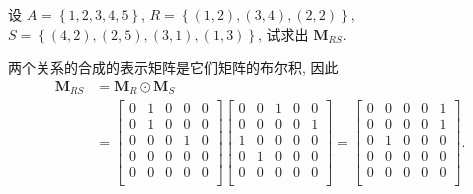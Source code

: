 \documentclass[10pt,UTF8]{book} %
\begin{document}
\begin{exercise}
    设 $A = \left\{1,2,3,4,5\right\}$,
    $R = \left\{ (1,2), (3,4), (2,2) \right\}$,
    $S = \left\{ (4,2), (2,5), (3,1), (1,3) \right\}$,
    试求出 $\boldsymbol{M}_{RS}$.
    \begin{sol}
        两个关系的合成的表示矩阵是它们矩阵的布尔积,
        因此 
        \[ \begin{aligned}
            \boldsymbol{M}_{RS} &= \boldsymbol{M}_{R} \odot
            \boldsymbol{M}_{S} \\
            &= \begin{bmatrix}
                0 & 1 & 0 & 0 & 0 \\
                0 & 1 & 0 & 0 & 0 \\
                0 & 0 & 0 & 1 & 0 \\
                0 & 0 & 0 & 0 & 0 \\
                0 & 0 & 0 & 0 & 0 \\
            \end{bmatrix} 
            \begin{bmatrix}
                0 & 0 & 1 & 0 & 0 \\
                0 & 0 & 0 & 0 & 1 \\
                1 & 0 & 0 & 0 & 0 \\
                0 & 1 & 0 & 0 & 0 \\
                0 & 0 & 0 & 0 & 0 \\
            \end{bmatrix}
            = \begin{bmatrix}
                0 & 0 & 0 & 0 & 1 \\
                0 & 0 & 0 & 0 & 1 \\
                0 & 1 & 0 & 0 & 0 \\
                0 & 0 & 0 & 0 & 0 \\
                0 & 0 & 0 & 0 & 0 \\
            \end{bmatrix}.
        \end{aligned} \]
    \end{sol}
\end{exercise}
\end{document}
